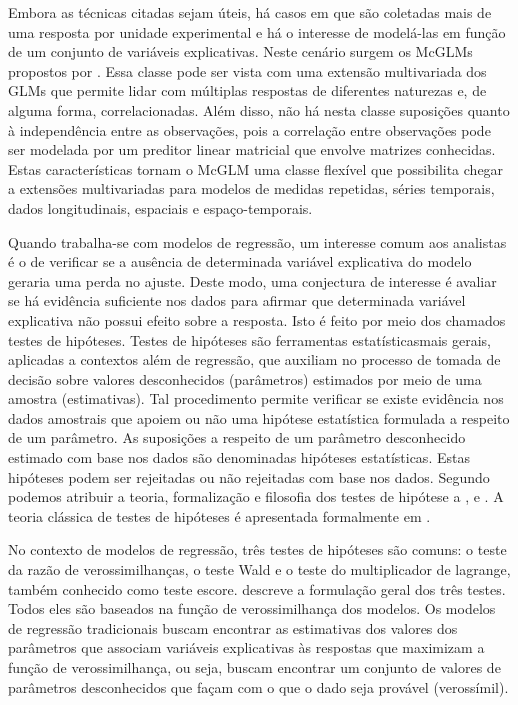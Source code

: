 Embora as técnicas citadas sejam úteis, há casos em que são coletadas mais de uma resposta por unidade experimental e há o interesse de modelá-las em função de um conjunto de variáveis explicativas. Neste cenário surgem os McGLMs propostos por \citet{Bonat16}. Essa classe pode ser vista com uma extensão multivariada dos GLMs que permite lidar com múltiplas respostas de diferentes naturezas e, de alguma forma, correlacionadas. Além disso, não há nesta classe suposições quanto à independência entre as observações, pois a correlação entre observações pode ser modelada por um preditor linear matricial que envolve matrizes conhecidas. Estas características tornam o McGLM uma classe flexível que possibilita chegar a extensões multivariadas para modelos de medidas repetidas, séries temporais, dados longitudinais, espaciais e espaço-temporais.


Quando trabalha-se com modelos de regressão, um interesse comum aos analistas é o de verificar se a ausência de determinada variável explicativa do modelo geraria uma perda no ajuste. Deste modo, uma conjectura de interesse é avaliar se há evidência suficiente nos dados para afirmar que determinada variável explicativa não possui efeito sobre a resposta. Isto é feito por meio dos chamados testes de hipóteses. Testes de hipóteses são ferramentas estatísticasmais gerais, aplicadas a contextos além de regressão, que auxiliam no processo de tomada de decisão sobre valores desconhecidos (parâmetros) estimados por meio de uma amostra (estimativas). Tal procedimento permite verificar se existe evidência nos dados amostrais que apoiem ou não uma hipótese estatística formulada a respeito de um parâmetro. As suposições a respeito de um parâmetro desconhecido estimado com base nos dados são denominadas hipóteses estatísticas. Estas hipóteses podem ser rejeitadas ou não rejeitadas com base nos dados. Segundo \citet{lehmann} podemos atribuir a teoria, formalização e filosofia dos testes de hipótese a \citet{neyman1}, \citet{neyman2} e \citet{fisher}. A teoria clássica de testes de hipóteses é apresentada formalmente em \citet{lehmann2}.

No contexto de modelos de regressão, três testes de hipóteses são comuns: o teste da razão de verossimilhanças, o teste Wald e o teste do multiplicador de lagrange, também conhecido como teste escore. \citet{engle} descreve a formulação geral dos três testes. Todos eles são baseados na função de verossimilhança dos modelos. Os modelos de regressão tradicionais buscam encontrar as estimativas dos valores dos parâmetros que associam variáveis explicativas às respostas que maximizam a função de verossimilhança, ou seja, buscam encontrar um conjunto de valores de parâmetros desconhecidos que façam com o que o dado seja provável (verossímil).

